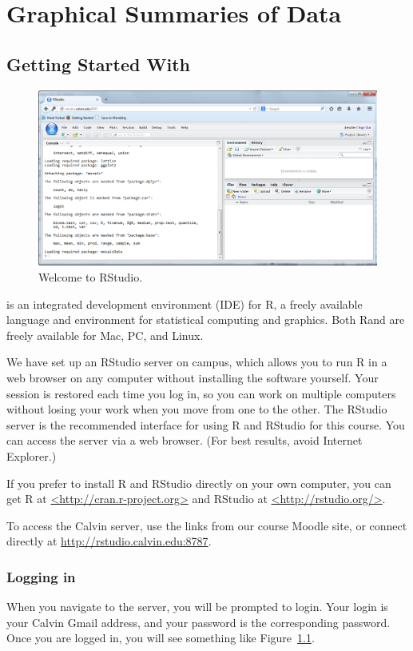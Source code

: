 \documentclass[twoside]{book}\usepackage[]{graphicx}\usepackage[]{xcolor}
\def\Chapter#1{%
\chapter{#1}
}
\def\R{{\sf R}}
\def\Rstudio{{\sf RStudio}}
\begin{document}
\Chapter{Graphical Summaries of Data}

\section{Getting Started With \RStudio}

\begin{figure}
\begin{center}
\includegraphics[width=.85\textwidth]{images/RStudio-Welcome2}
\end{center}
\caption{Welcome to \Rstudio.}
\label{fig:Rstudio-welcome}%
\end{figure}

\RStudio{} is an integrated development environment (IDE) for \R,  
a freely available language and environment for statistical computing and graphics.
Both \R and \RStudio{} are freely available for Mac, PC, and Linux.  

We have set up an RStudio server on campus, which allows you to run R in a web browser on any computer without installing the software yourself.  Your session is restored each time you log in, so you can work on multiple computers without losing your work when you move from one to the other.  The RStudio server is the recommended interface for using R and RStudio for this course. You can access the \RStudio{} server via a web browser.  (For best results, avoid 
Internet Explorer.)

If you prefer to install R and RStudio directly on your own computer, you can get R at \url{<http://cran.r-project.org>} and RStudio at \url{<http://rstudio.org/>}.    

To access the Calvin \RStudio{} server, use the links from our course
Moodle site, or connect directly at \url{http://rstudio.calvin.edu:8787}.

\subsection{Logging in}
When you navigate to the \RStudio{} server, you will be prompted to login.  
Your login is your Calvin Gmail address, and your password is the corresponding password. 
Once you are logged in, you will see something like 
Figure~\ref{fig:Rstudio-welcome}.
\end{document}
